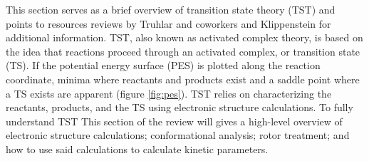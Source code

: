 \documentclass[preprint, 11pt]{elsarticle} %
\begin{document}
This section serves as a brief overview of transition state theory (TST) and points to resources reviews by Truhlar and coworkers \cite{truhlar:1996} and Klippenstein \cite{Klippenstein:2017eu} for additional information.
TST, also known as activated complex theory, is based on the idea that reactions proceed through an activated complex, or transition state (TS).
If the potential energy surface (PES) is plotted along the reaction coordinate, minima where reactants and products exist and a saddle point where a TS exists are apparent (figure \ref{fig:pes}). 
TST relies on characterizing the reactants, products, and the TS using electronic structure calculations.
To fully understand TST 
This section of the review will gives a high-level overview of electronic structure calculations; conformational analysis; rotor treatment; and how to use said calculations to calculate kinetic parameters.
\end{document}
